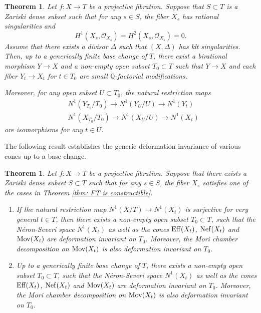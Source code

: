 \documentclass[11pt,oneside,reqno]{amsart}
\numberwithin{equation}{section}
\newtheorem{theorem}[proposition]{Theorem}
\theoremstyle{definition}
\newcommand{\Nef}{{\rm {Nef}}}
\newcommand{\Eff}{{\rm {Eff}}}
\newcommand{\Mov}{{\rm {Mov}}}
\newcommand{\bQ}{\mathbb{Q}}
\newcommand{\mO}{\mathcal{O}}
\begin{document}
\begin{theorem}\label{thm: fiberwise q-fact}
Let $f: X \to T$ be a projective fibration. Suppose that $S\subset T$ is a Zariski dense subset such that for any $s\in S$, the fiber $X_s$ has rational singularities and
\[
H^1(X_s, \mO_{X_s})=H^2(X_s, \mO_{X_s})=0.
\] 
Assume that there exists a divisor $\Delta$ such that $(X, \Delta)$ has klt singularities. Then, up to a generically finite base change of $T$, there exist a birational morphism $Y \to X$ and a non-empty open subset $T_0 \subset T$ such that $Y \to X$ and each fiber $Y_t \to X_t$ for $t \in T_0$ are small $\bQ$-factorial modifications.

Moreover, for any open subset $U\subset T_0$, the natural restriction maps
\[
\begin{split}
    &N^1(Y_{T_0}/T_0) \to N^1(Y_U/U) \to N^1(Y_t)\\
    &N^1(X_{T_0}/T_0) \to N^1(X_U/U) \to N^1(X_t)
\end{split}
\] are isomorphisms for any $t\in U$.
\end{theorem}

The following result establishes the generic deformation invariance of various cones up to a base change.  

\begin{theorem}\label{mainthm: decomposition}
Let $f: X \to T$ be a projective fibration. Suppose that there exists a Zariski dense subset $S\subset T$ such that for any $s\in S$, the fiber $X_s$ satisfies one of the cases in Theorem \ref{thm: FT is constructible}.
\begin{enumerate}
    \item If the natural restriction map $N^1(X/T) \to N^1(X_t)$ is surjective for very general $t\in T$, then there exists a non-empty open subset $T_0\subset T$, such that the N\'eron-Severi space $N^1(X_t)$ as well as the cones $\Eff(X_t)$, $\Nef(X_t)$ and $\Mov(X_t)$ are deformation invariant on $T_0$. Moreover, the Mori chamber decomposition on $\Mov(X_t)$ is also deformation invariant on $T_0$.
    \item Up to a generically finite base change of $T$, there exists a non-empty open subset $T_0\subset T$, such that  the N\'eron-Severi space $N^1(X_t)$ as well as the cones $\Eff(X_t)$, $\Nef(X_t)$ and $\Mov(X_t)$ are deformation invariant on $T_0$. Moreover, the Mori chamber decomposition on $\Mov(X_t)$ is also deformation invariant on $T_0$.
\end{enumerate} 
\end{theorem}
\end{document}
